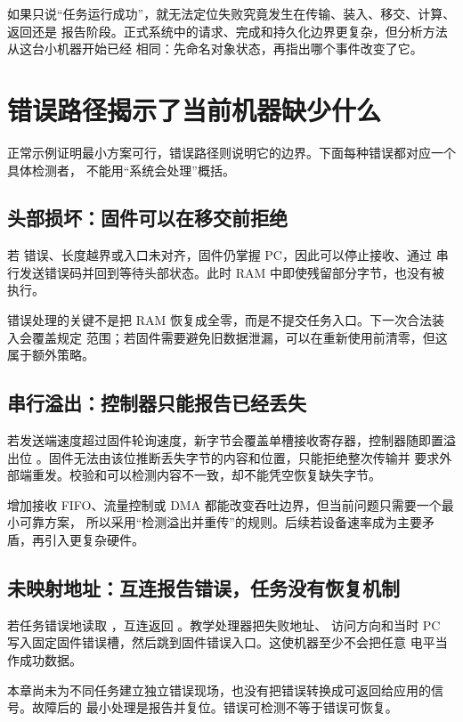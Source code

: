 如果只说“任务运行成功”，就无法定位失败究竟发生在传输、装入、移交、计算、返回还是
报告阶段。正式系统中的请求、完成和持久化边界更复杂，但分析方法从这台小机器开始已经
相同：先命名对象状态，再指出哪个事件改变了它。

\section{错误路径揭示了当前机器缺少什么}

正常示例证明最小方案可行，错误路径则说明它的边界。下面每种错误都对应一个具体检测者，
不能用“系统会处理”概括。

\subsection{头部损坏：固件可以在移交前拒绝}

若  错误、长度越界或入口未对齐，固件仍掌握 PC，因此可以停止接收、通过
串行发送错误码并回到等待头部状态。此时 RAM 中即使残留部分字节，也没有被执行。

错误处理的关键不是把 RAM 恢复成全零，而是不提交任务入口。下一次合法装入会覆盖规定
范围；若固件需要避免旧数据泄漏，可以在重新使用前清零，但这属于额外策略。

\subsection{串行溢出：控制器只能报告已经丢失}

若发送端速度超过固件轮询速度，新字节会覆盖单槽接收寄存器，控制器随即置溢出位
。固件无法由该位推断丢失字节的内容和位置，只能拒绝整次传输并
要求外部端重发。校验和可以检测内容不一致，却不能凭空恢复缺失字节。

增加接收 FIFO、流量控制或 DMA 都能改变吞吐边界，但当前问题只需要一个最小可靠方案，
所以采用“检测溢出并重传”的规则。后续若设备速率成为主要矛盾，再引入更复杂硬件。

\subsection{未映射地址：互连报告错误，任务没有恢复机制}

若任务错误地读取 ，互连返回 。教学处理器把失败地址、
访问方向和当时 PC 写入固定固件错误槽，然后跳到固件错误入口。这使机器至少不会把任意
电平当作成功数据。

本章尚未为不同任务建立独立错误现场，也没有把错误转换成可返回给应用的信号。故障后的
最小处理是报告并复位。错误可检测不等于错误可恢复。

